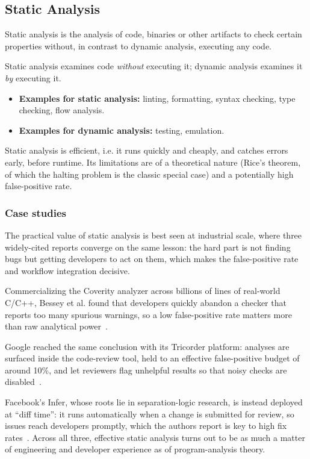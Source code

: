 \documentclass[conference]{IEEEtran}
\begin{document}
\subsection{Static Analysis}

Static analysis is the analysis of code, binaries or other artifacts to check certain properties without, in contrast to dynamic analysis, executing any code. \cite{nielson1999ppa}

Static analysis examines code \emph{without} executing it; dynamic analysis examines it \emph{by} executing it.
\begin{itemize}
  \item \textbf{Examples for static analysis:} linting, formatting, syntax checking, type checking, flow analysis.
  \item \textbf{Examples for dynamic analysis:} testing, emulation.
\end{itemize}

Static analysis is efficient, i.e. it runs quickly and cheaply, and catches errors early, before runtime. Its limitations are of a theoretical nature (Rice's theorem, of which the halting problem is the classic special case) and a potentially high false-positive rate.

\subsubsection{\textbf{Case studies}}

The practical value of static analysis is best seen at industrial scale, where three widely-cited reports converge on the same lesson: the hard part is not finding bugs but getting developers to act on them, which makes the false-positive rate and workflow integration decisive.

Commercializing the Coverity analyzer across billions of lines of real-world C/C++, Bessey et al. found that developers quickly abandon a checker that reports too many spurious warnings, so a low false-positive rate matters more than raw analytical power~\cite{bessey2010coverity}.

Google reached the same conclusion with its Tricorder platform: analyses are surfaced inside the code-review tool, held to an effective false-positive budget of around 10\%, and let reviewers flag unhelpful results so that noisy checks are disabled~\cite{sadowski2018google}.

Facebook's Infer, whose roots lie in separation-logic research, is instead deployed at ``diff time'': it runs automatically when a change is submitted for review, so issues reach developers promptly, which the authors report is key to high fix rates~\cite{distefano2019facebook}. Across all three, effective static analysis turns out to be as much a matter of engineering and developer experience as of program-analysis theory.
\end{document}
